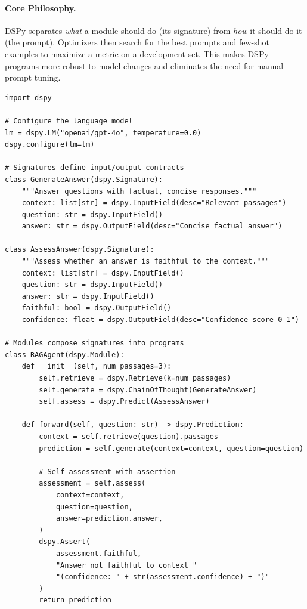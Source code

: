 \paragraph{Core Philosophy.}
\label{core-philosophy.}

DSPy separates \emph{what} a module should do (its signature) from \emph{how} it should do it (the prompt). Optimizers then search for the best prompts and few-shot examples to maximize a metric on a development set. This makes DSPy programs more robust to model changes and eliminates the need for manual prompt tuning.

\begin{lstlisting}[style=pythonstyle, caption={DSPy signatures and modules}]
import dspy

# Configure the language model
lm = dspy.LM("openai/gpt-4o", temperature=0.0)
dspy.configure(lm=lm)

# Signatures define input/output contracts
class GenerateAnswer(dspy.Signature):
    """Answer questions with factual, concise responses."""
    context: list[str] = dspy.InputField(desc="Relevant passages")
    question: str = dspy.InputField()
    answer: str = dspy.OutputField(desc="Concise factual answer")

class AssessAnswer(dspy.Signature):
    """Assess whether an answer is faithful to the context."""
    context: list[str] = dspy.InputField()
    question: str = dspy.InputField()
    answer: str = dspy.InputField()
    faithful: bool = dspy.OutputField()
    confidence: float = dspy.OutputField(desc="Confidence score 0-1")

# Modules compose signatures into programs
class RAGAgent(dspy.Module):
    def __init__(self, num_passages=3):
        self.retrieve = dspy.Retrieve(k=num_passages)
        self.generate = dspy.ChainOfThought(GenerateAnswer)
        self.assess = dspy.Predict(AssessAnswer)

    def forward(self, question: str) -> dspy.Prediction:
        context = self.retrieve(question).passages
        prediction = self.generate(context=context, question=question)

        # Self-assessment with assertion
        assessment = self.assess(
            context=context,
            question=question,
            answer=prediction.answer,
        )
        dspy.Assert(
            assessment.faithful,
            "Answer not faithful to context "
            "(confidence: " + str(assessment.confidence) + ")"
        )
        return prediction
\end{lstlisting}

